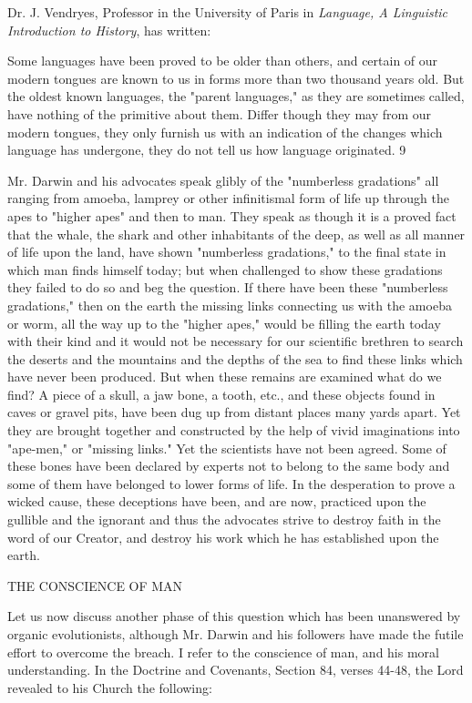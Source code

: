 Dr. J. Vendryes, Professor in the University of Paris in \textit{Language, A Linguistic Introduction
to History}, has written:

Some languages have been proved to be older than others, and certain of our modern tongues
are known to us in forms more than two thousand years old. But the oldest known languages,
the "parent languages," as they are sometimes called, have nothing of the primitive about
them. Differ though they may from our modern tongues, they only furnish us with an
indication of the changes which language has undergone, they do not tell us how language
originated. 9

Mr. Darwin and his advocates speak glibly of the "numberless gradations" all ranging from
amoeba, lamprey or other infinitismal form of life up through the apes to "higher apes" and
then to man. They speak as though it is a proved fact that the whale, the shark and other
inhabitants of the deep, as well as all manner of life upon the land, have shown "numberless
gradations," to the final state in which man finds himself today; but when challenged to show
these gradations they failed to do so and beg the question. If there have been these
"numberless gradations," then on the earth the missing links connecting us with the amoeba
or worm, all the way up to the "higher apes," would be filling the earth today with their kind
and it would not be necessary for our scientific brethren to search the deserts and the
mountains and the depths of the sea to find these links which have never been produced. But
when these remains are examined what do we find? A piece of a skull, a jaw bone, a tooth,
etc., and these objects found in caves or gravel pits, have been dug up from distant places
many yards apart. Yet they are brought together and constructed by the help of vivid
imaginations into "ape-men," or "missing links." Yet the scientists have not been agreed.
Some of these bones have been declared by experts not to belong to the same body and some
of them have belonged to lower forms of life. In the desperation to prove a wicked cause,
these deceptions have been, and are now, practiced upon the gullible and the ignorant and
thus the advocates strive to destroy faith in the word of our Creator, and destroy his work
which he has established upon the earth.

THE CONSCIENCE OF MAN

Let us now discuss another phase of this question which has been unanswered by organic
evolutionists, although Mr. Darwin and his followers have made the futile effort to overcome
the breach. I refer to the conscience of man, and his moral understanding. In the Doctrine and
Covenants, Section 84, verses 44-48, the Lord revealed to his Church the following:

